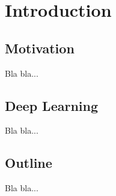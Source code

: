 

\chapter{Introduction}\label{chapter:introduction}



\section{Motivation}

Bla bla...

\section{Deep Learning}

Bla bla...

\section{Outline}

Bla bla...


